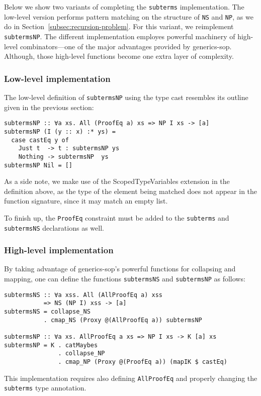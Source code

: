 \documentclass[runningheads]{llncs}
\newcommand{\K}[1]{\lstinline{#1}}
\begin{document}
Below we show two variants of completing the \K{subterms} implementation. The low-level version performs pattern matching on the structure of \K{NS} and \K{NP}, as we do in Section~\ref{subsec:recursion-problem}. For this variant, we reimplement \K{subtermsNP}. The different implementation employes powerful machinery of high-level combinators---one of the major advantages provided by \textsf{generics-sop}. Although, those high-level functions become one extra layer of complexity.

\subsubsection{Low-level implementation}

The low-level definition of \K{subtermsNP} using the type cast resembles its outline given in the previous section:
\begin{lstlisting}
subtermsNP :: ∀a xs. All (ProofEq a) xs => NP I xs -> [a]
subtermsNP (I (y :: x) :* ys) =
  case castEq y of
    Just t  -> t : subtermsNP ys
    Nothing -> subtermsNP  ys
subtermsNP Nil = []
\end{lstlisting}

As a side note, we make use of the \textsf{ScopedTypeVariables} extension in the definition above, as the type of the element being matched does not appear in the function signature, since it may match an empty list. 

To finish up, the \K{ProofEq} constraint must be added to the \K{subterms} and \K{subtermsNS} declarations as well.

\subsubsection{High-level implementation}

By taking advantage of \textsf{generics-sop}'s powerful functions for collapsing and mapping, one can define the functions \K{subtermsNS} and \K{subtermsNP} as follows:
\begin{lstlisting}
subtermsNS :: ∀a xss. All (AllProofEq a) xss
           => NS (NP I) xss -> [a]
subtermsNS = collapse_NS
           . cmap_NS (Proxy @(AllProofEq a)) subtermsNP

subtermsNP :: ∀a xs. AllProofEq a xs => NP I xs -> K [a] xs
subtermsNP = K . catMaybes
               . collapse_NP
               . cmap_NP (Proxy @(ProofEq a)) (mapIK $ castEq)
\end{lstlisting}
This implementation requires also defining \K{AllProofEq} and properly changing the \K{subterms} type annotation.
\end{document}
